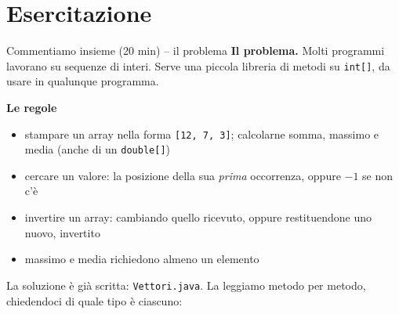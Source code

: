 \documentclass[10pt,aspectratio=169]{beamer}
\begin{document}
\section{Esercitazione}

\begin{frame}[fragile]{Commentiamo insieme (20 min) -- il problema}
\small
\textbf{Il problema.} Molti programmi lavorano su sequenze di interi. Serve una piccola libreria di metodi su \texttt{int[]}, da usare in qualunque programma.

\vspace{0.1cm}
\textbf{Le regole}
\begin{itemize}\itemsep=1pt
    \item stampare un array nella forma \texttt{[12, 7, 3]}; calcolarne somma, massimo e media (anche di un \texttt{double[]})
    \item cercare un valore: la posizione della sua \emph{prima} occorrenza, oppure $-1$ se non c'è
    \item invertire un array: cambiando quello ricevuto, oppure restituendone uno nuovo, invertito
    \item massimo e media richiedono almeno un elemento
\end{itemize}

La soluzione è già scritta: \texttt{Vettori.java}. La leggiamo metodo per metodo, chiedendoci di quale tipo è ciascuno:

\end{frame}
\end{document}

